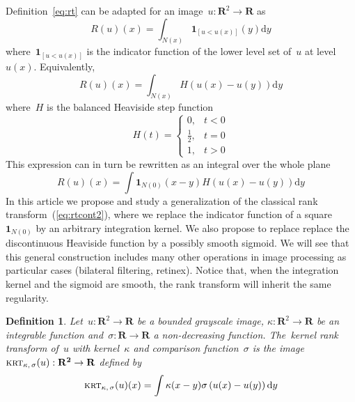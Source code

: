 \documentclass[12pt]{article}                  %
\newtheorem{definition}{Definition}
\def\parens#1{\left(#1\right)}
\begin{document}
Definition~\ref{eq:rt} can be adapted for an
image~$u:\mathbf{R}^2\to\mathbf{R}$ as
\begin{equation}\label{eq:rtcont}
	R(u)(x) = \int_{N(x)}\mathbf{1}_{\left[u < u(x)\right]}(y)\mathrm{d}y
\end{equation}
where~$\mathbf{1}_{\left[u < u(x)\right]}$ is the indicator function of the
lower level set of~$u$ at level~$u(x)$.  Equivalently,
\begin{equation}\label{eq:rtcont}
	R(u)(x) = \int_{N(x)}H(u(x)-u(y))\mathrm{d}y
\end{equation}
where~$H$ is the balanced Heaviside step function
\begin{equation}\label{eq:heaviside}
	H(t)=\begin{cases}
		0,&t< 0\\
		\frac12,&t=0\\
		1,& t>0
\end{cases}
\end{equation}
This expression can in turn be rewritten as an integral over the whole plane
\begin{equation}\label{eq:rtcont2}
	R(u)(x) = \int\mathbf{1}_{N(0)}(x-y)H(u(x)-u(y))\mathrm{d}y
\end{equation}
In this article we propose and study a generalization of the classical rank
transform~(\ref{eq:rtcont2}), where we replace the indicator function of a
square~$\mathbf{1}_{N(0)}$ by an arbitrary integration kernel.
We also propose to replace
replace the discontinuous Heaviside function by a possibly smooth sigmoid.
We will see that this general construction includes many other operations in
image processing as particular cases (bilateral filtering, retinex).
Notice that, when the integration kernel and the sigmoid are smooth, the
rank transform will inherit the same regularity.

\begin{definition}\label{def:krt}
Let~$u:\mathbf{R}^2\to\mathbf{R}$ be a bounded grayscale image,
$\kappa:\mathbf{R}^2\to\mathbf{R}$ be an integrable function
and~$\sigma:\mathbf{R}\to\mathbf{R}$ a non-decreasing
function.  The~\emph{kernel rank transform of~$u$ with kernel~$\kappa$ and
comparison function~$\sigma$} is the
image~$\textsc{krt}_{\kappa,\,\sigma}(u):\mathbf{R^2}\to\mathbf{R}$ defined by
\begin{equation}\label{eq:rtdef}
	\textsc{krt}_{\kappa,\,\sigma}(u)(x) = \int\kappa(x-y)\sigma\parens{u(x)-u(y)}\mathrm{d}y
\end{equation}
\end{definition}
\end{document}
